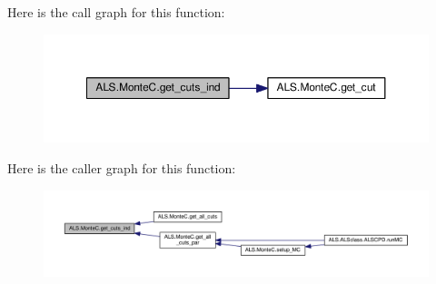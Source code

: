 Here is the call graph for this function\+:
\nopagebreak
\begin{figure}[H]
\begin{center}
\leavevmode
\includegraphics[width=350pt]{namespace_a_l_s_1_1_monte_c_aab81122b0c44d1d6b59570c4b32a0704_cgraph}
\end{center}
\end{figure}




Here is the caller graph for this function\+:
\nopagebreak
\begin{figure}[H]
\begin{center}
\leavevmode
\includegraphics[width=350pt]{namespace_a_l_s_1_1_monte_c_aab81122b0c44d1d6b59570c4b32a0704_icgraph}
\end{center}
\end{figure}



